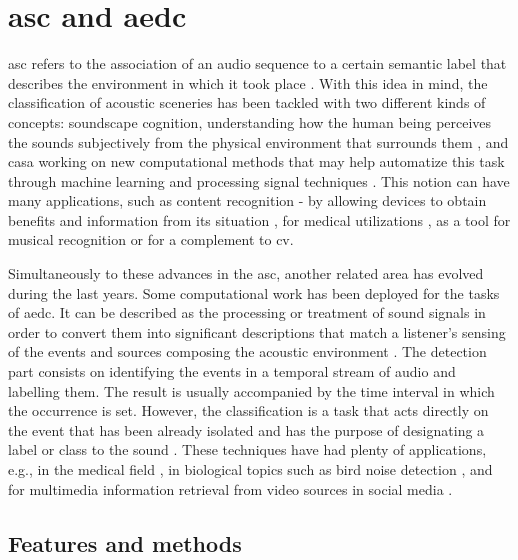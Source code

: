 
\section{\acrlong{asc} and \acrlong{aedc}}

	 \acrfull{asc} refers to the association of an audio sequence to a certain semantic label that describes the environment in which it took place \cite{Barchiesi2015}. With this idea in mind, the classification of acoustic sceneries has been tackled with two different kinds of concepts: soundscape cognition,  understanding how the human being perceives the sounds subjectively from the physical environment that surrounds them  \cite{Dubois2006}, and  \acrfull{casa}  working on new computational methods that may help automatize this task through machine learning and processing signal techniques \cite{Wang2006}. This notion can have many applications, such as content recognition - by allowing devices to obtain benefits and information from its situation \cite{Eronen2006}, for medical utilizations \cite{Bahoura2009}, as a tool for musical recognition \cite{Van2013} or for a complement to \acrfull{cv}.
	
	Simultaneously to these advances in the \acrshort{asc}, another related area has evolved during the last years. Some computational work has been deployed for the tasks of \acrfull{aedc}. It can be described as the processing or treatment of sound signals in order to convert them into significant descriptions that match a listener's sensing of the events and sources composing the acoustic environment \cite{Temko2009}. The detection part consists on identifying the events in a temporal stream of audio and labelling them. The result is usually accompanied by the time interval in which the occurrence is set. However, the classification is a task that acts directly on the event that has been already isolated and has the purpose of designating a label or class to the sound \cite{Temko2007}. These techniques have had plenty of applications, e.g., in the medical field \cite{Bahoura2010}, in biological topics such as bird noise detection \cite{Potamitis2014}, and for multimedia information retrieval from video sources in social media \cite{Wang2016}.

\subsection{Features and methods}
\label{subsection:features-and-methods}
	
